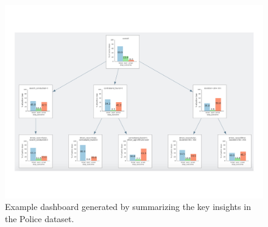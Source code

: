 \begin{figure}[h!]
\centering
\includegraphics[width=0.7\linewidth]{figures/storyboard.pdf}
\caption{Example dashboard generated by \sbd summarizing the key insights in the Police dataset.}
\label{fig:sbd}
\end{figure} 

